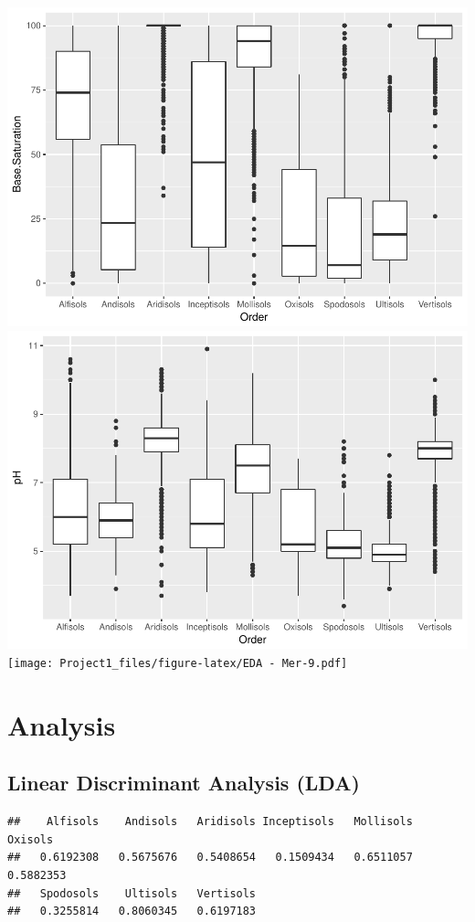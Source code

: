 \documentclass[]{article}
\begin{document}
\includegraphics{Project1_files/figure-latex/EDA - Mer-7.pdf}
\includegraphics{Project1_files/figure-latex/EDA - Mer-8.pdf}
\texttt{[image: Project1\_files/figure-latex/EDA - Mer-9.pdf]}

\section{Analysis}\label{analysis}

\subsection{Linear Discriminant Analysis
(LDA)}\label{linear-discriminant-analysis-lda}

\begin{verbatim}
##    Alfisols    Andisols   Aridisols Inceptisols   Mollisols     Oxisols 
##   0.6192308   0.5675676   0.5408654   0.1509434   0.6511057   0.5882353 
##   Spodosols    Ultisols   Vertisols 
##   0.3255814   0.8060345   0.6197183
\end{verbatim}
\end{document}
